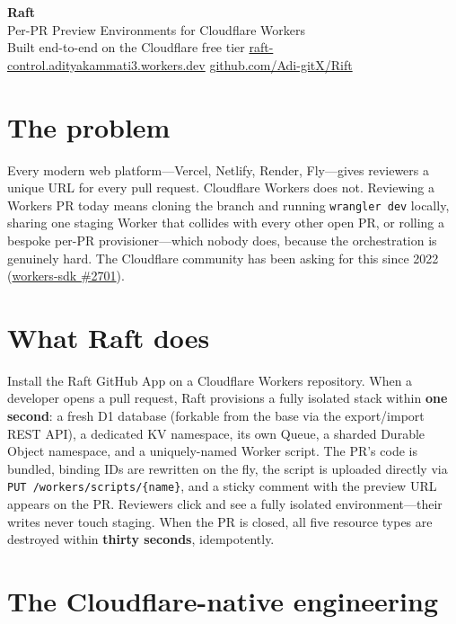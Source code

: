 \documentclass[11pt]{article}
\begin{document}
\begin{center}
  {\Huge\bfseries\color{ink} Raft}\\[2pt]
  {\large\color{muted} Per-PR Preview Environments for Cloudflare Workers}\\[6pt]
  {\small\color{muted} Built end-to-end on the Cloudflare free tier \quad\textbar\quad
   \href{https://raft-control.adityakammati3.workers.dev}{raft-control.adityakammati3.workers.dev}
   \quad\textbar\quad
   \href{https://github.com/Adi-gitX/Rift}{github.com/Adi-gitX/Rift}}
\end{center}

\vspace{4pt}

\section*{The problem}

Every modern web platform---Vercel, Netlify, Render, Fly---gives reviewers a unique URL for every pull request. Cloudflare Workers does not. Reviewing a Workers PR today means cloning the branch and running \texttt{wrangler dev} locally, sharing one staging Worker that collides with every other open PR, or rolling a bespoke per-PR provisioner---which nobody does, because the orchestration is genuinely hard. The Cloudflare community has been asking for this since 2022 (\href{https://github.com/cloudflare/workers-sdk/issues/2701}{workers-sdk \#2701}).

\section*{What Raft does}

Install the Raft GitHub App on a Cloudflare Workers repository. When a developer opens a pull request, Raft provisions a fully isolated stack within \textbf{one second}: a fresh D1 database (forkable from the base via the export/import REST API), a dedicated KV namespace, its own Queue, a sharded Durable Object namespace, and a uniquely-named Worker script. The PR's code is bundled, binding IDs are rewritten on the fly, the script is uploaded directly via \texttt{PUT /workers/scripts/\{name\}}, and a sticky comment with the preview URL appears on the PR. Reviewers click and see a fully isolated environment---their writes never touch staging. When the PR is closed, all five resource types are destroyed within \textbf{thirty seconds}, idempotently.

\section*{The Cloudflare-native engineering}
\end{document}
